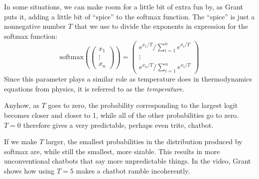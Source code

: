 \documentclass{article}
\begin{document}
In some situations, we can make room for a little bit of extra fun by, as Grant puts it, adding a little bit of ``spice'' to the softmax function. The ``spice'' is just a nonnegative number $T$ that we use to divide the exponents in expression for the softmax function:
$$
\text{softmax} \left( \begin{pmatrix} x_1 \\ \vdots \\ x_n \end{pmatrix} \right)
=
\begin{pmatrix} e^{x_1/T}/\sum_{i = 1}^n e^{x_i/T} \\ \vdots \\ e^{x_n/T}/\sum_{i = 1}^n e^{x_i/T} \end{pmatrix}
$$
Since this parameter plays a similar role as temperature does in thermodynamics equations from physics, it is referred to as the \textit{temperature}.

Anyhow, as $T$ goes to zero, the probability corresponding to the largest logit becomes closer and closer to 1, while all of the other probabilities go to zero. $T = 0$ therefore gives a very predictable, perhaps even trite, chatbot.

If we make $T$ larger, the smallest probabilities in the distribution produced by softmax are, while still the smallest, more sizable. This results in more unconventional chatbots that say more unpredictable things. In the video, Grant shows how using $T = 5$ makes a chatbot ramble incoherently.
\end{document}
